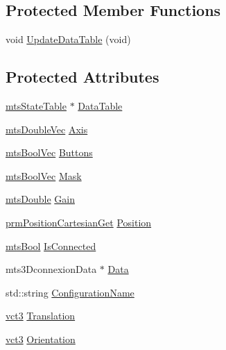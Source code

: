 \subsection*{Protected Member Functions}
\begin{DoxyCompactItemize}
\item 
void \hyperlink{classmts3_dconnexion_a58d9df19ed8b33d6daadc588ceffacb3}{Update\+Data\+Table} (void)
\end{DoxyCompactItemize}
\subsection*{Protected Attributes}
\begin{DoxyCompactItemize}
\item 
\hyperlink{classmts_state_table}{mts\+State\+Table} $\ast$ \hyperlink{classmts3_dconnexion_a297dbc803c7b296a06d90b59d6c2cd3e}{Data\+Table}
\item 
\hyperlink{mts_vector_8h_af69167a5dc2ad33eb93965b9387d8403}{mts\+Double\+Vec} \hyperlink{classmts3_dconnexion_aef658870f656a1ccb93a065d74d74e4b}{Axis}
\item 
\hyperlink{mts_vector_8h_a11c0cbf286b972226b08510c6ba92e67}{mts\+Bool\+Vec} \hyperlink{classmts3_dconnexion_a8fc19fc124985d015c53b9580ca7355f}{Buttons}
\item 
\hyperlink{mts_vector_8h_a11c0cbf286b972226b08510c6ba92e67}{mts\+Bool\+Vec} \hyperlink{classmts3_dconnexion_a9aa79512dbed22a9c69d56ec7e757791}{Mask}
\item 
\hyperlink{mts_generic_object_proxy_8h_a31e76b0190a8d3f9838626cd7b47bd75}{mts\+Double} \hyperlink{classmts3_dconnexion_a790ed1fc6b5a64b4a1d022a541c3ae90}{Gain}
\item 
\hyperlink{classprm_position_cartesian_get}{prm\+Position\+Cartesian\+Get} \hyperlink{classmts3_dconnexion_a18477fb46941bead7c9c998aa4f64cae}{Position}
\item 
\hyperlink{mts_generic_object_proxy_8h_ae2e26261f1874d4aa4ee374ece7646bd}{mts\+Bool} \hyperlink{classmts3_dconnexion_a7242b5dd56fed7c290e054fe129e2c00}{Is\+Connected}
\item 
mts3\+Dconnexion\+Data $\ast$ \hyperlink{classmts3_dconnexion_af6ca74b9b8dd0a73f56cc7d0eab06fc4}{Data}
\item 
std\+::string \hyperlink{classmts3_dconnexion_af68f59f690ccf2fd198b90eedae0e769}{Configuration\+Name}
\item 
\hyperlink{vct_fixed_size_vector_types_8h_a3af82acdbf4eeb73c551909240b106ea}{vct3} \hyperlink{classmts3_dconnexion_a8e84db133cf3e6f2624b231a05e049bf}{Translation}
\item 
\hyperlink{vct_fixed_size_vector_types_8h_a3af82acdbf4eeb73c551909240b106ea}{vct3} \hyperlink{classmts3_dconnexion_afff4aa6e11a99251eaf021e9bba2047c}{Orientation}
\end{DoxyCompactItemize}
